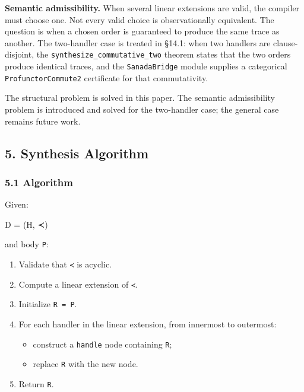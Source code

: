 \documentclass[
  11pt,
]{article}
\newenvironment{Shaded}{}{}
\newcommand{\NormalTok}[1]{#1}
\providecommand{\tightlist}{%
  \setlength{\itemsep}{0pt}\setlength{\parskip}{0pt}}
\begin{document}
\textbf{Semantic admissibility.} When several linear extensions are
valid, the compiler must choose one. Not every valid choice is
observationally equivalent. The question is when a chosen order is
guaranteed to produce the same trace as another. The two-handler case is
treated in §14.1: when two handlers are clause-disjoint, the
\texttt{synthesize\_commutative\_two} theorem states that the two orders
produce identical traces, and the \texttt{SanadaBridge} module supplies
a categorical \texttt{ProfunctorCommute2} certificate for that
commutativity.

The structural problem is solved in this paper. The semantic
admissibility problem is introduced and solved for the two-handler case;
the general case remains future work.

\subsection{5. Synthesis Algorithm}\label{synthesis-algorithm}

\subsubsection{5.1 Algorithm}\label{algorithm}

Given:

\begin{Shaded}
\begin{Highlighting}[]
\NormalTok{D = (H, ≺)}
\end{Highlighting}
\end{Shaded}

and body \texttt{P}:

\begin{enumerate}
\def\labelenumi{\arabic{enumi}.}
\item
  Validate that \texttt{≺} is acyclic.
\item
  Compute a linear extension of \texttt{≺}.
\item
  Initialize \texttt{R\ =\ P}.
\item
  For each handler in the linear extension, from innermost to outermost:

  \begin{itemize}
  \tightlist
  \item
    construct a \texttt{handle} node containing \texttt{R};
  \item
    replace \texttt{R} with the new node.
  \end{itemize}
\item
  Return \texttt{R}.
\end{enumerate}
\end{document}
